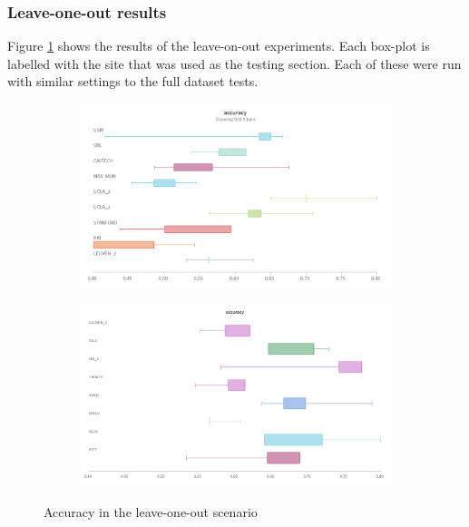 	\subsubsection{Leave-one-out results}

	Figure \ref{fig:leave_out} shows the results of the leave-on-out experiments. Each box-plot is labelled with the site that was used as the testing section. Each of these were run with similar settings to the full dataset tests.

	
	\begin{figure}[!h]
		\centering
		\begin{subfigure}[b]{0.8\textwidth}
			\centering
			\includegraphics[width=\textwidth]{figures/fkr.png}
		\end{subfigure}
		\hfill
		\begin{subfigure}[b]{0.8\textwidth}
			\centering
			\includegraphics[width=\textwidth]{figures/skr.png}
		\end{subfigure}
		\caption{Accuracy in the leave-one-out scenario}
		\label{fig:leave_out}
	\end{figure}




